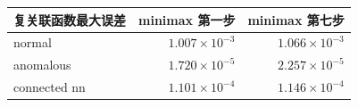 \begin{tabular}{lrr}
\toprule
复关联函数最大误差 & minimax 第一步 & minimax 第七步 \\
\midrule
normal & $1.007\times10^{-3}$ & $1.066\times10^{-3}$ \\
anomalous & $1.720\times10^{-5}$ & $2.257\times10^{-5}$ \\
connected nn & $1.101\times10^{-4}$ & $1.146\times10^{-4}$ \\
\bottomrule
\end{tabular}
